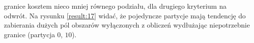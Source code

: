 granice kosztem nieco mniej równego podziału, dla drugiego kryterium na odwrót.
Na rysunku \ref{result:17} widać, że pojedyncze partycje mają tendencję do zabierania dużych pól obszarów wyłączonych z obliczeń
wydłużając niepotrzebnie granice (partycja $0$, $10$).
\begin{figure}[h]
\centering
\begin{subfigure}{.33\textwidth}
    \centering
    \caption[short]{}
\end{subfigure}%
\begin{subfigure}{.33\textwidth}
    \centering

\end{subfigure}
\end{figure}
